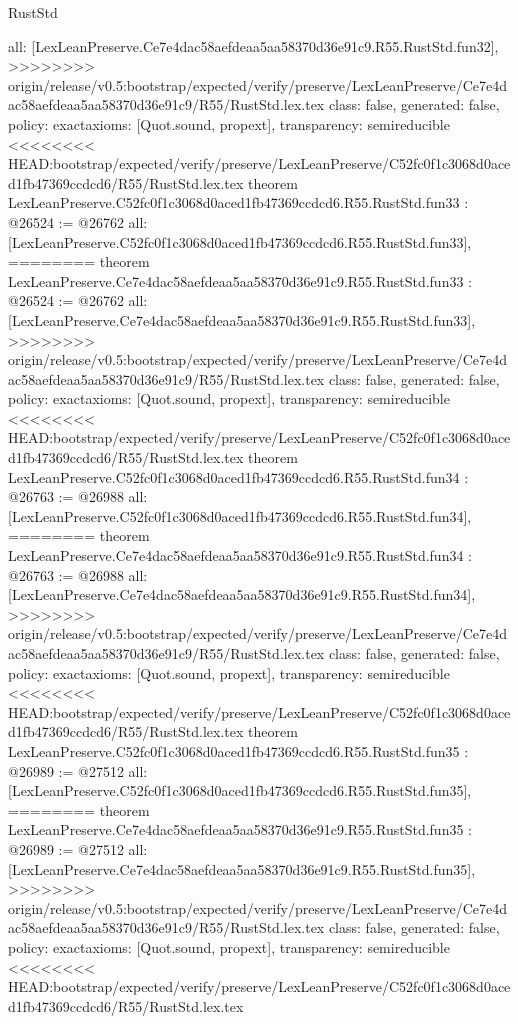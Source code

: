 \begin{lexlean}{RustStd}
\begin{coremodule}
{\begin{coremodule}
{{{{{{{{{{{{{{{{{{{{{{{{{{{{{{{{{{{{  all: [LexLeanPreserve.Ce7e4dac58aefdeaa5aa58370d36e91c9.R55.RustStd.fun32],
>>>>>>>> origin/release/v0.5:bootstrap/expected/verify/preserve/LexLeanPreserve/Ce7e4dac58aefdeaa5aa58370d36e91c9/R55/RustStd.lex.tex
  class: false,
  generated: false,
  policy: exact{axioms: [Quot.sound, propext]},
  transparency: semireducible
}
<<<<<<<< HEAD:bootstrap/expected/verify/preserve/LexLeanPreserve/C52fc0f1c3068d0aced1fb47369ccdcd6/R55/RustStd.lex.tex
theorem LexLeanPreserve.C52fc0f1c3068d0aced1fb47369ccdcd6.R55.RustStd.fun33 : @26524 := @26762 {
  all: [LexLeanPreserve.C52fc0f1c3068d0aced1fb47369ccdcd6.R55.RustStd.fun33],
========
theorem LexLeanPreserve.Ce7e4dac58aefdeaa5aa58370d36e91c9.R55.RustStd.fun33 : @26524 := @26762 {
  all: [LexLeanPreserve.Ce7e4dac58aefdeaa5aa58370d36e91c9.R55.RustStd.fun33],
>>>>>>>> origin/release/v0.5:bootstrap/expected/verify/preserve/LexLeanPreserve/Ce7e4dac58aefdeaa5aa58370d36e91c9/R55/RustStd.lex.tex
  class: false,
  generated: false,
  policy: exact{axioms: [Quot.sound, propext]},
  transparency: semireducible
}
<<<<<<<< HEAD:bootstrap/expected/verify/preserve/LexLeanPreserve/C52fc0f1c3068d0aced1fb47369ccdcd6/R55/RustStd.lex.tex
theorem LexLeanPreserve.C52fc0f1c3068d0aced1fb47369ccdcd6.R55.RustStd.fun34 : @26763 := @26988 {
  all: [LexLeanPreserve.C52fc0f1c3068d0aced1fb47369ccdcd6.R55.RustStd.fun34],
========
theorem LexLeanPreserve.Ce7e4dac58aefdeaa5aa58370d36e91c9.R55.RustStd.fun34 : @26763 := @26988 {
  all: [LexLeanPreserve.Ce7e4dac58aefdeaa5aa58370d36e91c9.R55.RustStd.fun34],
>>>>>>>> origin/release/v0.5:bootstrap/expected/verify/preserve/LexLeanPreserve/Ce7e4dac58aefdeaa5aa58370d36e91c9/R55/RustStd.lex.tex
  class: false,
  generated: false,
  policy: exact{axioms: [Quot.sound, propext]},
  transparency: semireducible
}
<<<<<<<< HEAD:bootstrap/expected/verify/preserve/LexLeanPreserve/C52fc0f1c3068d0aced1fb47369ccdcd6/R55/RustStd.lex.tex
theorem LexLeanPreserve.C52fc0f1c3068d0aced1fb47369ccdcd6.R55.RustStd.fun35 : @26989 := @27512 {
  all: [LexLeanPreserve.C52fc0f1c3068d0aced1fb47369ccdcd6.R55.RustStd.fun35],
========
theorem LexLeanPreserve.Ce7e4dac58aefdeaa5aa58370d36e91c9.R55.RustStd.fun35 : @26989 := @27512 {
  all: [LexLeanPreserve.Ce7e4dac58aefdeaa5aa58370d36e91c9.R55.RustStd.fun35],
>>>>>>>> origin/release/v0.5:bootstrap/expected/verify/preserve/LexLeanPreserve/Ce7e4dac58aefdeaa5aa58370d36e91c9/R55/RustStd.lex.tex
  class: false,
  generated: false,
  policy: exact{axioms: [Quot.sound, propext]},
  transparency: semireducible
}
<<<<<<<< HEAD:bootstrap/expected/verify/preserve/LexLeanPreserve/C52fc0f1c3068d0aced1fb47369ccdcd6/R55/RustStd.lex.tex
}}}}}}}}}}}}}}}}}}}}}}}}}}}}}}}}}}}}}}
\end{coremodule}}
\end{coremodule}
\end{lexlean}
